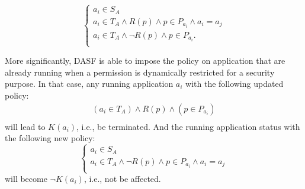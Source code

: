 \[\left\{
\begin{array}{l}
a_i \in S_A\\
a_i \in T_A \wedge R\left(p\right) \wedge p \in P_{a_{i}} \wedge
a_i = a_j\\
a_i \in T_{A} \wedge \lnot R\left(p\right) \wedge p \in P_{a_{i}}.\\
\end{array}
\right.
\]






\begin{comment}
$a_{i} \in T_{A} \wedge R\left(p\right) \wedge p \in P_{a_{i}} \wedge a_{i} \neq a_{j} \to \lnot L\left(C_{a_{i}}\right)$
\end{comment}
More significantly, DASF is able to impose the
policy on application that are already running when a permission is
dynamically restricted for a security purpose.  In that case, any
running application $a_i$ with the following updated policy:
\[\left.
\begin{array}{l}
(a_{i} \in T_{A}) \wedge R\left(p\right) \wedge (p \in P_{a_{i}})\\
\end{array}
\right.
\]
will lead to $K(a_i)$, i.e., be terminated.  And the running
application status with the following
new policy:
\[\left \{
\begin{array}{l}
a_{i} \in S_{A}\\
a_{i} \in T_{A} \wedge \lnot R\left(p\right) \wedge p \in P_{a_{i}} \wedge a_{i} = a_{j}\\
\end{array}
\right.
\]
will become $\lnot K(a_i)$, i.e., not be affected.




